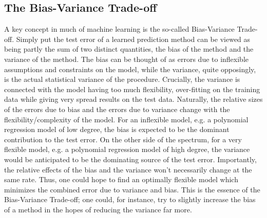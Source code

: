 \documentclass[reprint, english, nofootinbib]{revtex4-2}
\begin{document}
    \subsection{The Bias-Variance Trade-off}

        \noindent
        A key concept in much of machine learning is the so-called Bias-Variance Trade-off. Simply put the test error of a learned prediction method can be viewed as being partly the sum of two distinct quantities, the bias of the method and the variance of the method. The bias can be thought of as errors due to inflexible assumptions and constraints on the model, while the variance, quite opposingly, is the actual statistical variance of the procedure. Crucially, the variance is connected with the model having too much flexibility, over-fitting on the training data while giving very spread results on the test data. Naturally, the relative sizes of the errors due to bias and the errors due to variance change with the flexibility/complexity of the model. For an inflexible model, e.g. a polynomial regression model of low degree, the bias is expected to be the dominant contribution to the test error. On the other side of the spectrum, for a very flexible model, e.g. a polynomial regression model of high degree, the variance would be anticipated to be the dominating source of the test error. Importantly, the relative effects of the bias and the variance won't necessarily change at the same rate. Thus, one could hope to find an optimally flexible model which minimizes the combined error due to variance and bias. This is the essence of the Bias-Variance Trade-off; one could, for instance, try to slightly increase the bias of a method in the hopes of reducing the variance far more.
\end{document}

